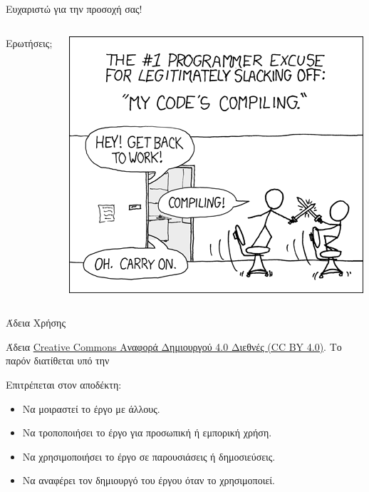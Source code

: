 \documentclass[aspectratio=169]{beamer}
\begin{document}
\begin{frame}{Ευχαριστώ για την προσοχή σας!}
  \begin{columns}
    \begin{column}{0.4\textwidth}
      \begin{center}
        \Huge{Ερωτήσεις;}
      \end{center}
    \end{column}
    \begin{column}{0.6\textwidth}
      \begin{center}
        \includegraphics[width=0.9\textheight]{images/xkcd.png}
      \end{center}
    \end{column}
  \end{columns}
\end{frame}
\begin{frame}{Άδεια Χρήσης}
  \begin{center}
    \ccbysa
  \end{center}
  \begin{center}
    Άδεια \href{https://creativecommons.org/licenses/by/4.0/}{Creative Commons Αναφορά Δημιουργού 4.0 Διεθνές (CC BY 4.0)}.  Το παρόν διατίθεται υπό την
    \ccbysa
  \end{center}
  \begin{exampleblock}{Επιτρέπεται στον αποδέκτη:}
    \begin{itemize}
      \item Να μοιραστεί το έργο με άλλους.
      \item Να τροποποιήσει το έργο για προσωπική ή εμπορική χρήση.
      \item Να χρησιμοποιήσει το έργο σε παρουσιάσεις ή δημοσιεύσεις.
      \item Να αναφέρει τον δημιουργό του έργου όταν το χρησιμοποιεί.
    \end{itemize}
  \end{exampleblock}
\end{frame}
\end{document}
